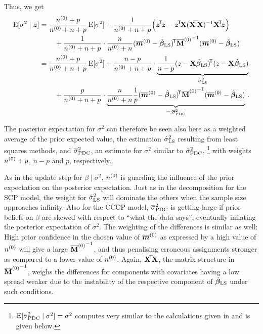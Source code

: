 Thus, we get
\begin{align}
\E[\sigma^2\mid\z] &= \frac{\nz + p}{\nz + n + p} \E[\sigma^2]
                     +\frac{1}      {\nz + n + p} \Big( \ztz - \ztX (\XtX)^{-1} \Xtz \Big) \nonumber\\ & \hspace*{5ex}
                     +\frac{1}      {\nz + n + p} \cdot \frac{n}{\nz + n} (\tmz - \bls)^\tra {\tMz}^{-1} (\tmz - \bls) \nonumber\\
                   &= \frac{\nz + p}{\nz + n + p} \E[\sigma^2]
                     +\frac{n - p}  {\nz + n + p} \cdot \underbrace{\frac{1}{n-p} %
                                                          (z - \X\bls)^\tra (z - \X\bls)}_{\sls} \nonumber\\ & \hspace*{5ex}
                     +\frac{p}      {\nz + n + p} \cdot \underbrace{\frac{n}{\nz + n} %
                                                          \frac{1}{p} (\tmz - \bls)^\tra {\tMz}^{-1} (\tmz - \bls)}_{=:\tspdc}\,.
\label{equ:cccp-sigma2}
\end{align}

The posterior expectation for $\sigma^2$ can therefore be seen also here as
a weighted average of the prior expected value,
the estimation $\hat{\sigma}^2_\text{LS}$ resulting from least squares methods,
and $\overline{\sigma}^2_\text{PDC}$, an estimate for $\sigma^2$ similar to $\hat{\sigma}^2_\text{PDC}$,%
\footnote{$\operatorname{E}[\overline{\sigma}^2_\text{PDC}\mid\sigma^2]=\sigma^2$ computes very similar to the
calculations given in \textcite[p.~249]{1994:ohagan} and is given below.}
with weights $n^{(0)} + p$, $n-p$ and $p$, respectively.

As in the update step for $\beta\mid\sigma^2$, $n^{(0)}$ is guarding the
influence of the prior expectation on the posterior expectation.
Just as in the decomposition for the SCP model,
the weight for $\hat{\sigma}^2_\text{LS}$ will dominate the others when the sample size approaches infinity.
%
Also for the CCCP model, $\overline{\sigma}^2_\text{PDC}$ %
is getting large if prior beliefs on $\beta$ are skewed with respect to ``what the data says'',
eventually inflating the posterior expectation of $\sigma^2$.
The weighting of the differences is similar as well: High prior confidence
in the chosen value of $\overline{{\bm m}}^{(0)}$ as expressed by a high value of $n^{(0)}$ will
give a large ${\overline{\mathbf{M}}^{(0)}}^{-1}$, and thus penalising erroneous assignments stronger
as compared to a lower value of $n^{(0)}$.
Again, $\mathbf{X}^{{\mbox{\!\scriptsize\textsf{T}}}} \! \mathbf{X}$, the matrix structure in ${\overline{\mathbf{M}}^{(0)}}^{-1}$, weighs the differences
for components with covariates having a low spread weaker
due to the instability of the respective component of $\hat{\boldsymbol{\beta}}_\text{LS}$ under such conditions.

